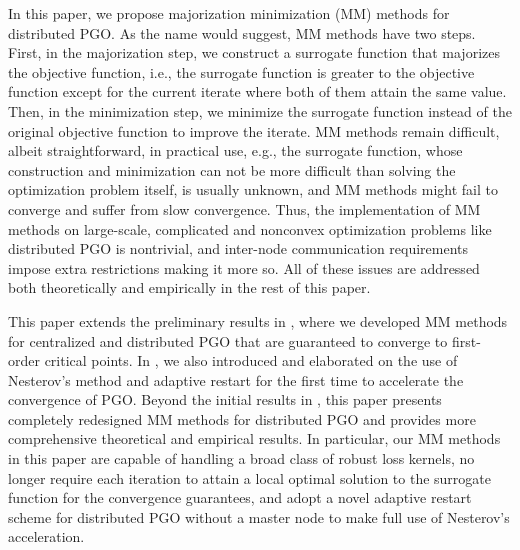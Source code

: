 In this paper, we propose majorization minimization (MM) methods \cite{hunter2004tutorial,sun2016majorization} for distributed PGO. As the name would suggest, MM methods have two steps. First, in the majorization step, we construct a surrogate function that majorizes the objective function, i.e., the surrogate function is greater to the objective function except for the current iterate where both of them attain the same value. Then, in the minimization step, we minimize the surrogate function instead of the original objective function to improve the iterate. MM methods remain difficult, albeit straightforward, in practical use, e.g., the surrogate function, whose construction and minimization can not be more difficult than solving the optimization problem itself, is usually unknown, and MM methods might fail to converge and suffer from slow convergence. Thus, the implementation of MM methods on large-scale, complicated and nonconvex optimization problems like distributed PGO is nontrivial, and inter-node communication requirements impose extra restrictions making it more so. All of these issues  are  addressed both theoretically and empirically in the rest of this paper.

This paper extends the preliminary results in \cite{fan2019proximal,fan2020mm}, where we developed MM methods for centralized and distributed PGO that are guaranteed to converge to first-order critical points. In \cite{fan2019proximal,fan2020mm}, we also introduced and elaborated on the use of Nesterov's method \cite{nesterov1983method,nesterov2013introductory} and adaptive restart \cite{o2015adaptive} for the first time to accelerate the convergence of PGO. Beyond the initial results in \cite{fan2019proximal,fan2020mm}, this paper presents completely redesigned MM methods for distributed PGO and provides more comprehensive theoretical and  empirical results. In particular, our MM methods in this paper are capable of handling a broad class of robust loss kernels, no longer require each iteration to attain a local optimal solution to the surrogate function for the convergence guarantees, and adopt a novel adaptive restart scheme for distributed PGO without a master node to make full use of Nesterov's acceleration.

